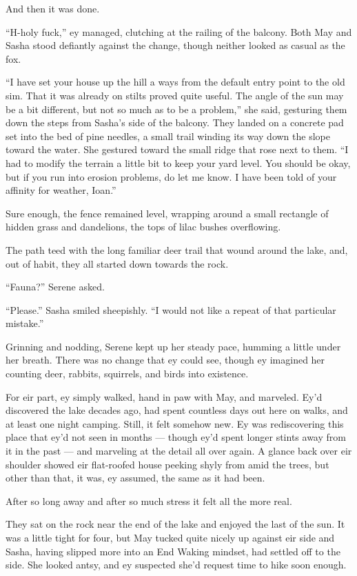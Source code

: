 And then it was done.

``H-holy fuck,'' ey managed, clutching at the railing of the balcony. Both May and Sasha stood defiantly against the change, though neither looked as casual as the fox.

``I have set your house up the hill a ways from the default entry point to the old sim. That it was already on stilts proved quite useful. The angle of the sun may be a bit different, but not so much as to be a problem,'' she said, gesturing them down the steps from Sasha's side of the balcony. They landed on a concrete pad set into the bed of pine needles, a small trail winding its way down the slope toward the water. She gestured toward the small ridge that rose next to them. ``I had to modify the terrain a little bit to keep your yard level. You should be okay, but if you run into erosion problems, do let me know. I have been told of your affinity for weather, Ioan.''

Sure enough, the fence remained level, wrapping around a small rectangle of hidden grass and dandelions, the tops of lilac bushes overflowing.

The path teed with the long familiar deer trail that wound around the lake, and, out of habit, they all started down towards the rock.

``Fauna?'' Serene asked.

``Please.'' Sasha smiled sheepishly. ``I would not like a repeat of that particular mistake.''

Grinning and nodding, Serene kept up her steady pace, humming a little under her breath. There was no change that ey could see, though ey imagined her counting deer, rabbits, squirrels, and birds into existence.

For eir part, ey simply walked, hand in paw with May, and marveled. Ey'd discovered the lake decades ago, had spent countless days out here on walks, and at least one night camping. Still, it felt somehow new. Ey was rediscovering this place that ey'd not seen in months — though ey'd spent longer stints away from it in the past — and marveling at the detail all over again. A glance back over eir shoulder showed eir flat-roofed house peeking shyly from amid the trees, but other than that, it was, ey assumed, the same as it had been.

After so long away and after so much stress it felt all the more real.

They sat on the rock near the end of the lake and enjoyed the last of the sun. It was a little tight for four, but May tucked quite nicely up against eir side and Sasha, having slipped more into an End Waking mindset, had settled off to the side. She looked antsy, and ey suspected she'd request time to hike soon enough.

